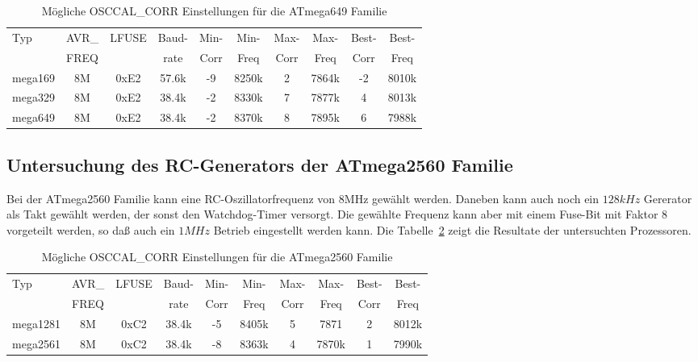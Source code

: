 \begin{table}[H]
  \begin{center}
    \begin{tabular}{| l | c | c | c || c | c || c | c || c | c |}
    \hline
   Typ  &       AVR\_ & LFUSE & Baud- & Min- & Min- & Max- & Max- & Best- & Best-  \\
        &       FREQ  &       & rate & Corr & Freq & Corr & Freq  & Corr  & Freq  \\
    \hline
    \hline
mega169 &          8M & 0xE2  & 57.6k &  -9  & 8250k & 2  & 7864k  & -2  & 8010k \\
    \hline
mega329 &          8M & 0xE2  & 38.4k &  -2  & 8330k & 7  & 7877k  &  4  & 8013k \\
    \hline
mega649 &          8M & 0xE2  & 38.4k &  -2  & 8370k & 8  & 7895k  &  6  & 7988k \\
    \hline
    \end{tabular}
  \end{center}
  \caption{Mögliche OSCCAL\_CORR Einstellungen für die ATmega649 Familie}
  \label{tab:mega649freq}
\end{table}

\subsection{Untersuchung des RC-Generators der ATmega2560 Familie}

Bei der ATmega2560 Familie kann  eine RC-Oszillatorfrequenz von 8MHz gewählt werden. Daneben kann
auch noch ein \(128kHz\) Gererator als Takt gewählt werden, der sonst den Watchdog-Timer versorgt.
Die gewählte Frequenz kann aber mit einem Fuse-Bit mit Faktor 8 vorgeteilt werden,
so daß auch ein \(1MHz\) Betrieb eingestellt werden kann.
Die Tabelle~\ref{tab:mega2560freq} zeigt die Resultate der untersuchten Prozessoren.

\begin{table}[H]
  \begin{center}
    \begin{tabular}{| l | c | c | c || c | c || c | c || c | c |}
    \hline
   Typ  &       AVR\_ & LFUSE & Baud- & Min- & Min- & Max- & Max- & Best- & Best-  \\
        &       FREQ  &       & rate & Corr & Freq & Corr & Freq  & Corr  & Freq  \\
    \hline
    \hline
mega1281 &          8M & 0xC2  & 38.4k &  -5 & 8405k & 5 & 7871   & 2  &  8012k \\
    \hline
mega2561 &          8M & 0xC2  & 38.4k &  -8 & 8363k & 4  & 7870k  & 1  & 7990k \\
    \hline
    \end{tabular}
  \end{center}
  \caption{Mögliche OSCCAL\_CORR Einstellungen für die ATmega2560 Familie}
  \label{tab:mega2560freq}
\end{table}

